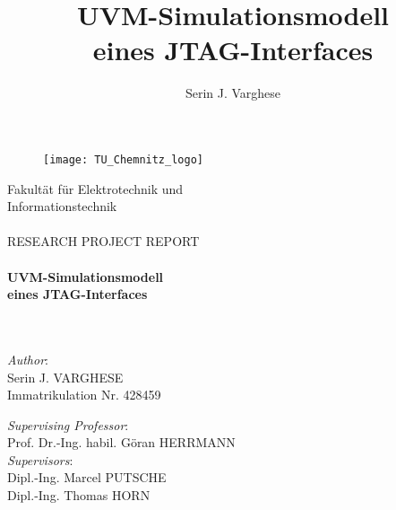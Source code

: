 \documentclass[a4paper,11pt]{article}
\title{\Huge{UVM-Simulationsmodell \\eines JTAG-Interfaces}}
\author{Serin J. Varghese}
\date{}
\newcommand\blankpage{%
\null
\thispagestyle{empty}%
\addtocounter{page}{-1}%
\newpage}
\begin{document}
\maketitle
\thispagestyle{empty}
\pagebreak

\newlength{\toptafiddle} 
\newlength{\bottafiddle}
\setlength{\toptafiddle}{1in}
\setlength{\bottafiddle}{1in}
\vspace*{-0.5in}
\enlargethispage{\bottafiddle}
\thispagestyle{empty}

\graphicspath{{./images/}}

\afterpage{\blankpage}


\begin{figure}[!h]
\centering
\texttt{[image: TU\_Chemnitz\_logo]}
\end{figure}

\begin{center}
{\Large Fakultät für Elektrotechnik und \\Informationstechnik\\
\ \\
RESEARCH PROJECT REPORT}\\
\ \\

\noindent\makebox[\linewidth]{\rule{\textwidth}{0.4pt}}
{\Large \textbf{UVM-Simulationsmodell \\eines JTAG-Interfaces} \\}
\noindent\makebox[\linewidth]{\rule{\textwidth}{0.4pt}}
\ \\
\ \\
\end{center}


\begin{minipage}[t]{0.5\textwidth}%
	\begin{flushleft}
		\large \textit{Author}: \\
		Serin J. VARGHESE\\
		Immatrikulation Nr. 428459
	\end{flushleft}
\end{minipage}
%
\begin{minipage}[t]{0.5\textwidth}%
	\begin{flushright}
		\large \textit{Supervising Professor}: \\
		Prof. Dr.-Ing. habil. Göran HERRMANN\\
		\vspace*{0.5cm}
		\large \textit{Supervisors}: \\
		Dipl.-Ing. Marcel PUTSCHE\\
		Dipl.-Ing. Thomas HORN
	\end{flushright}
\end{minipage}
\end{document}
